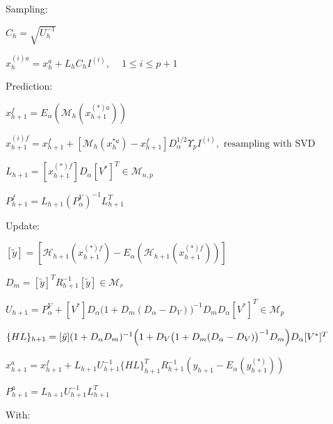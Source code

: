 \documentclass{tufte-book}
\begin{document}
\begin{DoxyEnumerate}
\item \-Sampling\-:
\begin{DoxyItemize}
\item $ C_{h} = \sqrt{U_h^{-1}} $\par

\item $ x_{h}^{(i)a} = x_h^a + L_hC_hI^{(i)} \textrm{, } \quad 1\leq i \leq p+1 $\par

\end{DoxyItemize}
\item \-Prediction\-:
\begin{DoxyItemize}
\item $ x_{h+1}^f = E_\alpha(\mathcal{M}_{h}(x_{h+1}^{(*)a})) $\par

\item $ x_{h+1}^{(i)f} = x_{h+1}^f + [\mathcal{M}_{h}(x_{h}^{*a}) - x_{h+1}^f]D_{\alpha}^{1/2} \Upsilon_p I^(i), \textrm{ resampling with SVD} $\par

\item $ L_{h+1} = [x_{h+1}^{(*)f}]D_\alpha [V^*]^T \in \mathcal{M}_{n,p} $\par

\item $ P_{h+1}^f = L_{h+1} (P_{\alpha}^V)^{-1} L_{h+1}^T $
\end{DoxyItemize}
\item \-Update\-:
\begin{DoxyItemize}
\item $ [\tilde{y}] = [\mathcal{H}_{h+1}(x_{h+1}^{(*)f}) - E_\alpha(\mathcal{H}_{h+1}(x_{h+1}^{(*)f})) ]$\par

\item $ D_m = [\tilde{y}]^T R_{h+1}^{-1}[\tilde{y}] \in \mathcal{M}_r $\par

\item $ U_{h+1} = P_{\alpha}^V + [V^*] D_\alpha \bigl(1 + D_m(D_\alpha - D_V)\bigr)^{-1} D_m D_\alpha [V^*]^T \in \mathcal{M}_{p} $\par

\item $ \{HL\}_{h+1} = [\tilde{y}]( 1 + D_\alpha D_m)^{-1}\Bigl(1 + D_V \bigl( 1+D_m (D_\alpha-D_V) \bigr)^{-1} D_m \Bigr) D_\alpha[V^*]^T $\par

\item $ x_{h+1}^a = x_{h+1}^f + L_{h+1}U_{h+1}^{-1}\{HL\}_{h+1}^T R_{h+1}^{-1} (y_{h+1}-E_\alpha(y_{h+1}^{(*)}))$\par

\item $ P_{h+1}^a = L_{h+1} U_{h+1}^{-1} L_{h+1}^T$
\end{DoxyItemize}
\end{DoxyEnumerate}\-With\-: \par
\end{document}
